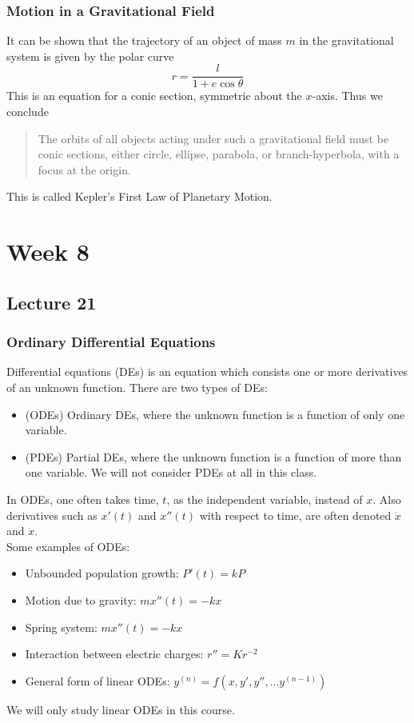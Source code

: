 \documentclass{report}
\begin{document}
\subsection*{Motion in a Gravitational Field}
It can be shown that the trajectory of an object of mass $m$ in the gravitational system is given by the polar curve
$$
	r = \frac{l}{1 + e\cos\theta}
$$
This is an equation for a conic section, symmetric about the $x$-axis. Thus we conclude 
\begin{quote}\begin{center}
	The orbits of all objects acting under such a gravitational field must be conic sections, either circle, ellipse, parabola, or branch-hyperbola, with a focus at the origin.
\end{center}\end{quote}
This is called Kepler's First Law of Planetary Motion.

\chapter{Week 8}
\section{Lecture 21}
\subsection*{Ordinary Differential Equations}
Differential equations (DEs) is an equation which consists one or more derivatives of an unknown function. There are two types of DEs:
\begin{itemize}
	\item (ODEs) Ordinary DEs, where the unknown function is a function of only one variable.
	\item (PDEs) Partial DEs, where the unknown function is a function of more than one variable. We will not consider PDEs at all in this class.
\end{itemize}
In ODEs, one often takes time, $t$, as the independent variable, instead of $x$. Also derivatives such as $x'(t)$ and $x''(t)$ with respect to time, are often denoted $\dot{x}$ and $\ddot{x}$.\\

Some examples of ODEs:
\begin{itemize}
	\item Unbounded population growth: $P'(t) = kP$
	\item Motion due to gravity: $mx''(t) = -kx$
	\item Spring system: $mx''(t) = -kx$
	\item Interaction between electric charges: $r'' = Kr^{-2}$
	\item General form of linear ODEs: $y^{(n)} = f(x, y', y'', \dots y^{(n-1)})$
\end{itemize}
We will only study linear ODEs in this course.
\end{document}
